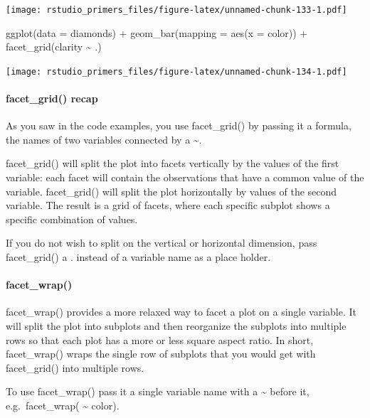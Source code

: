 \documentclass[
]{article}
\newenvironment{Shaded}{\begin{snugshade}}{\end{snugshade}}
\newcommand{\AttributeTok}[1]{\textcolor[rgb]{0.77,0.63,0.00}{#1}}
\newcommand{\FunctionTok}[1]{\textcolor[rgb]{0.00,0.00,0.00}{#1}}
\newcommand{\NormalTok}[1]{#1}
\newcommand{\SpecialCharTok}[1]{\textcolor[rgb]{0.00,0.00,0.00}{#1}}
\begin{document}
\texttt{[image: rstudio\_primers\_files/figure-latex/unnamed-chunk-133-1.pdf]}

\begin{Shaded}
\begin{Highlighting}[]
\FunctionTok{ggplot}\NormalTok{(}\AttributeTok{data =}\NormalTok{ diamonds) }\SpecialCharTok{+}
  \FunctionTok{geom\_bar}\NormalTok{(}\AttributeTok{mapping =} \FunctionTok{aes}\NormalTok{(}\AttributeTok{x =}\NormalTok{ color)) }\SpecialCharTok{+}
  \FunctionTok{facet\_grid}\NormalTok{(clarity }\SpecialCharTok{\textasciitilde{}}\NormalTok{ .)}
\end{Highlighting}
\end{Shaded}

\texttt{[image: rstudio\_primers\_files/figure-latex/unnamed-chunk-134-1.pdf]}

\hypertarget{facet_grid-recap}{%
\paragraph{facet\_grid() recap}\label{facet_grid-recap}}

As you saw in the code examples, you use facet\_grid() by passing it a
formula, the names of two variables connected by a \textasciitilde.

facet\_grid() will split the plot into facets vertically by the values
of the first variable: each facet will contain the observations that
have a common value of the variable. facet\_grid() will split the plot
horizontally by values of the second variable. The result is a grid of
facets, where each specific subplot shows a specific combination of
values.

If you do not wish to split on the vertical or horizontal dimension,
pass facet\_grid() a . instead of a variable name as a place holder.

\hypertarget{facet_wrap}{%
\paragraph{facet\_wrap()}\label{facet_wrap}}

facet\_wrap() provides a more relaxed way to facet a plot on a single
variable. It will split the plot into subplots and then reorganize the
subplots into multiple rows so that each plot has a more or less square
aspect ratio. In short, facet\_wrap() wraps the single row of subplots
that you would get with facet\_grid() into multiple rows.

To use facet\_wrap() pass it a single variable name with a
\textasciitilde{} before it, e.g.~facet\_wrap( \textasciitilde{} color).
\end{document}
